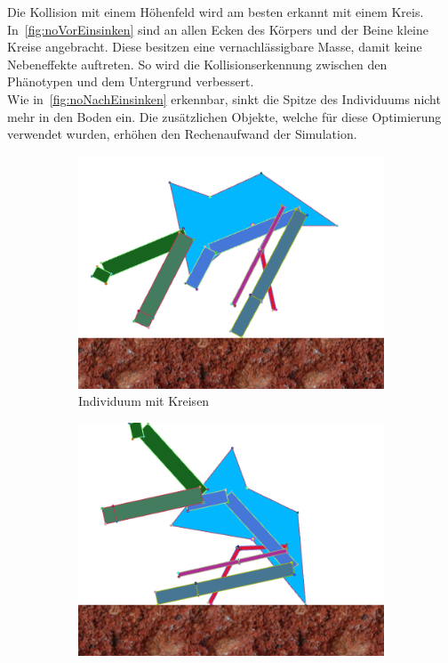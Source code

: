       Die Kollision mit einem Höhenfeld wird am besten erkannt mit einem Kreis.
      \\
      In~\vref{fig:noVorEinsinken} sind an allen Ecken des Körpers und der Beine kleine Kreise angebracht.
      Diese besitzen eine vernachlässigbare Masse, damit keine Nebeneffekte auftreten.
      So wird die Kollisionserkennung zwischen den Phänotypen und dem Untergrund verbessert.
      \\
      Wie in~\vref{fig:noNachEinsinken} erkennbar, sinkt die Spitze des Individuums nicht mehr in den Boden ein.
      Die zusätzlichen Objekte, welche für diese Optimierung verwendet wurden,
      erhöhen den Rechenaufwand der Simulation.

      \begin{figure}[H]
        \centering
        \begin{subfigure}[b]{0.45\textwidth}
          \includegraphics[width=\linewidth,center]{graphics/physics-engine/sink-fix-0}
          \caption{Individuum mit Kreisen\label{fig:noVorEinsinken}}
        \end{subfigure}
        \qquad
        \begin{subfigure}[b]{0.45\textwidth}
          \includegraphics[width=\linewidth,center]{graphics/physics-engine/sink-fix-1}

\end{subfigure}
\end{figure}

